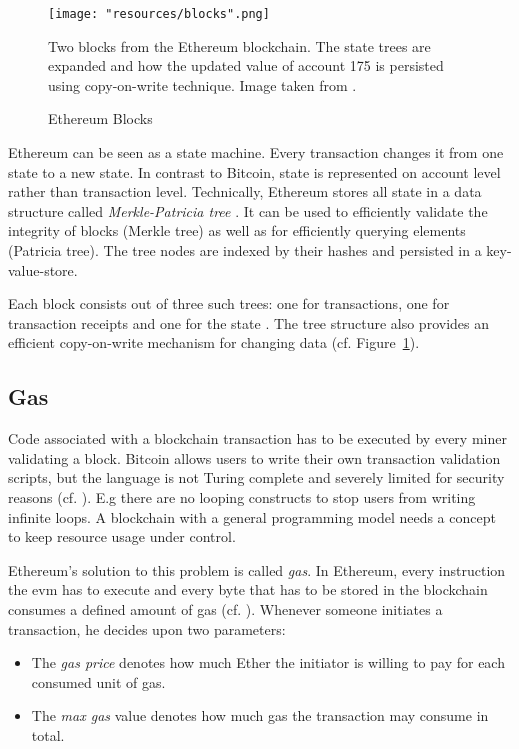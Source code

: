 \begin{figure}[]
	\centering
	\texttt{[image: "resources/blocks".png]}
	\caption{Ethereum Blocks}
	\label{fig:blocks}
	Two blocks from the Ethereum blockchain.
	The state trees are expanded and how the updated value of account 175
	is persisted using copy-on-write technique.
	Image taken from \cite{Buterin2015}.
\end{figure}

Ethereum can be seen as a state machine.
Every transaction changes it from one state to a new state.
In contrast to Bitcoin, state is represented on account level rather than
transaction level.
Technically, Ethereum stores all state in a data structure called \emph{Merkle-Patricia tree} \cite[sec.~4.1]{Wood18}.
It can be used to efficiently validate the integrity of blocks (Merkle tree)
as well as for efficiently querying elements (Patricia tree).
The tree nodes are indexed by their hashes and persisted in a key-value-store.

Each block consists out of three such trees: one for transactions, one for transaction receipts and one for the state \cite{Buterin2015}.
The tree structure also provides an efficient copy-on-write mechanism for changing data (cf. Figure~\ref{fig:blocks}).

\subsection{Gas}

Code associated with a blockchain transaction has to be executed by every miner validating a block.
Bitcoin allows users to write their own transaction validation scripts,
but the language is not Turing complete and severely limited for security reasons (cf. \cite{Costill16}).
E.g there are no looping constructs to stop users from writing infinite loops.
A blockchain with a general programming model needs a concept to keep resource usage under control.

Ethereum's solution to this problem is called {\em gas}. In Ethereum,
every instruction the \ac{evm} has to execute and every byte that has
to be stored in the blockchain consumes a defined amount of gas (cf. \cite{Rosic18}).
Whenever someone initiates a transaction, he decides upon two parameters:

\begin{itemize}
\item The \emph{gas price} denotes how much Ether the initiator is willing
  to pay for each consumed unit of gas.
  
\item The \emph{max gas} value denotes how much gas the transaction may
  consume in total.
\end{itemize}

